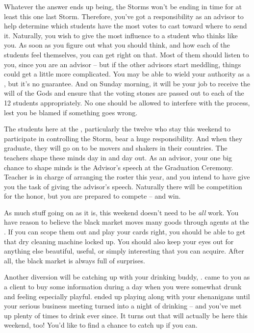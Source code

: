 \documentclass[char]{GL2020}
\begin{document}
Whatever the answer ends up being, the Storms won’t be ending in time for at least this one last Storm. Therefore, you’ve got a responsibility as an advisor to help determine which students have the most votes to cast toward where to send it. Naturally, you wish to give the most influence to a student who thinks like you. As soon as you figure out what you should think, and how each of the students feel themselves, you can get right on that. Most of them should listen to you, since you are an advisor -- but if the other advisors start meddling, things could get a little more complicated. You may be able to wield your authority as a \cHedonist{\cleric}, but it’s no guarantee. And on Sunday morning, it will be your job to receive the will of the Gods and ensure that the voting stones are passed out to each of the 12 students appropriately. No one should be allowed to interfere with the process, lest you be blamed if something goes wrong.

The students here at the \pSc{}, particularly the twelve who stay this weekend to participate in controlling the Storm, bear a huge responsibility. And when they graduate, they will go on to be movers and shakers in their countries. The teachers shape these minds day in and day out. As an advisor, your one big chance to shape minds is the Advisor’s speech at the Graduation Ceremony. Teacher \cMusic{} is in charge of arranging the roster this year, and you intend to have \cMusic{\them} give you the task of giving the advisor’s speech. Naturally there will be competition for the honor, but you are prepared to compete -- and win.

As much stuff going on as it is, this weekend doesn’t need to be \emph{all} work. You have reason to believe the black market moves many goods through agents at the \pSc{}. If you can scope them out and play your cards right, you should be able to get that dry cleaning machine locked up. You should also keep your eyes out for anything else beautiful, useful, or simply interesting that you can acquire. After all, the black market is always full of surprises.

Another diversion will be catching up with your drinking buddy, \cWildCard{}. \cWildCard{} came to you as a client to buy some information during a day when you were somewhat drunk and feeling especially playful. \cWildCard{} ended up playing along with your shenanigans until your serious business meeting turned into a night of drinking -- and you’ve met up plenty of times to drink ever since. It turns out that \cWildCard{} will actually be here this weekend, too! You’d like to find a chance to catch up if you can.
\end{document}
